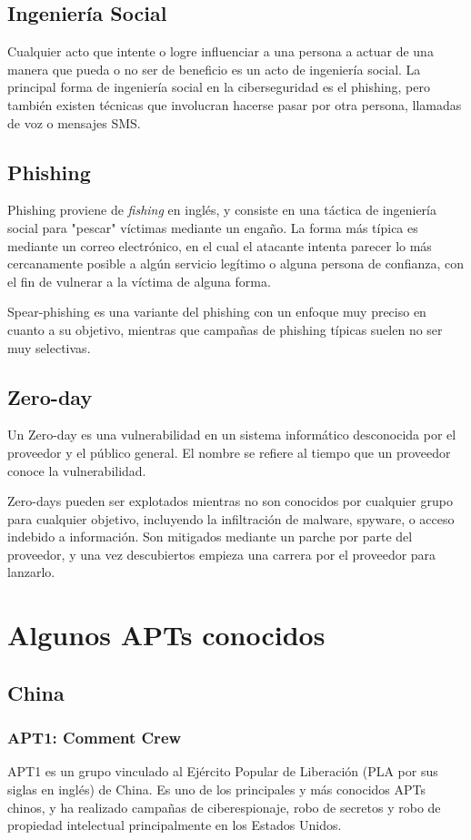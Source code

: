 \documentclass{article}
\begin{document}
\subsection{Ingeniería Social}
Cualquier acto que intente o logre influenciar a una persona a actuar de una manera que pueda o no ser de beneficio es un acto de ingeniería social. La principal forma de ingeniería social en la ciberseguridad es el phishing, pero también existen técnicas que involucran hacerse pasar por otra persona, llamadas de voz o mensajes SMS.

\subsection{Phishing}
Phishing proviene de {\it fishing} en inglés, y consiste en una táctica de ingeniería social para "pescar" víctimas mediante un engaño. La forma más típica es mediante un correo electrónico, en el cual el atacante intenta parecer lo más cercanamente posible a algún servicio legítimo o alguna persona de confianza, con el fin de vulnerar a la víctima de alguna forma.

Spear-phishing es una variante del phishing con un enfoque muy preciso en cuanto a su objetivo, mientras que campañas de phishing típicas suelen no ser muy selectivas.

\subsection{Zero-day}
Un Zero-day es una vulnerabilidad en un sistema informático desconocida por el proveedor y el público general. El nombre se refiere al tiempo que un proveedor conoce la vulnerabilidad.

Zero-days pueden ser explotados mientras no son conocidos por cualquier grupo para cualquier objetivo, incluyendo la infiltración de malware, spyware, o acceso indebido a información. Son mitigados mediante un parche por parte del proveedor, y una vez descubiertos empieza una carrera por el proveedor para lanzarlo.


\section{Algunos APTs conocidos}
\subsection{China}
\subsubsection{APT1: Comment Crew}
APT1 es un grupo vinculado al Ejército Popular de Liberación (PLA por sus siglas en inglés) de China. Es uno de los principales y más conocidos APTs chinos, y ha realizado campañas de ciberespionaje, robo de secretos y robo de propiedad intelectual principalmente en los Estados Unidos.
\end{document}
